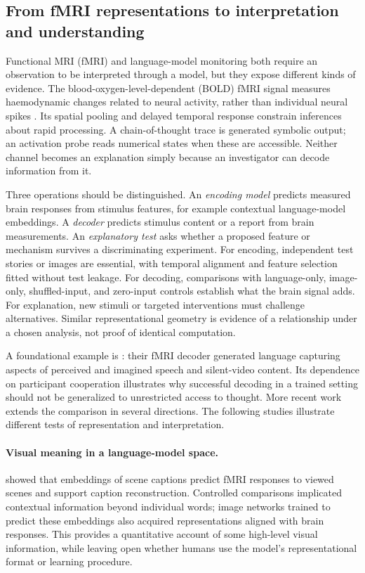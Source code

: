 \documentclass[11pt,a4paper]{article}
\begin{document}
\subsection{From fMRI representations to interpretation and understanding}
Functional MRI (fMRI) and language-model monitoring both require an observation to be interpreted through a model, but they expose different kinds of evidence. The blood-oxygen-level-dependent (BOLD) fMRI signal measures haemodynamic changes related to neural activity, rather than individual neural spikes \citep{logothetis2001}. Its spatial pooling and delayed temporal response constrain inferences about rapid processing. A chain-of-thought trace is generated symbolic output; an activation probe reads numerical states when these are accessible. Neither channel becomes an explanation simply because an investigator can decode information from it.

Three operations should be distinguished. An \emph{encoding model} predicts measured brain responses from stimulus features, for example contextual language-model embeddings. A \emph{decoder} predicts stimulus content or a report from brain measurements. An \emph{explanatory test} asks whether a proposed feature or mechanism survives a discriminating experiment. For encoding, independent test stories or images are essential, with temporal alignment and feature selection fitted without test leakage. For decoding, comparisons with language-only, image-only, shuffled-input, and zero-input controls establish what the brain signal adds. For explanation, new stimuli or targeted interventions must challenge alternatives. Similar representational geometry is evidence of a relationship under a chosen analysis, not proof of identical computation.

A foundational example is \citet{tang2023}: their fMRI decoder generated language capturing aspects of perceived and imagined speech and silent-video content. Its dependence on participant cooperation illustrates why successful decoding in a trained setting should not be generalized to unrestricted access to thought. More recent work extends the comparison in several directions. The following studies illustrate different tests of representation and interpretation.

\paragraph{Visual meaning in a language-model space.}
\citet{doerig2025} showed that embeddings of scene captions predict fMRI responses to viewed scenes and support caption reconstruction. Controlled comparisons implicated contextual information beyond individual words; image networks trained to predict these embeddings also acquired representations aligned with brain responses. This provides a quantitative account of some high-level visual information, while leaving open whether humans use the model's representational format or learning procedure.
\end{document}
